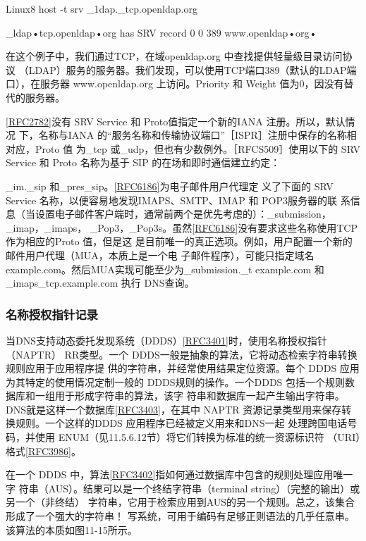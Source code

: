 Linux8 host -t srv \_1dap.\_tcp.openldap.org

\_ldap•tcp.openldap•org has SRV record 0 0 389 www.openldap•org•

在这个例子中，我们通过TCP，在域openldap.org 中查找提供轻量级目录访问协议
（LDAP）服务的服务器。我们发现，可以使用TCP端口389（默认的LDAP端口），在服务器
www.openldap.org 上访问。Priority 和 Weight 值为0，因没有替代的服务器。

\href{https://www.rfc-editor.org/rfc/rfc2782}{[RFC2782]}没有 SRV Service 和 Proto值指定一个新的IANA 注册。所以，默认情况
下，名称与IANA 的“服务名称和传输协议端口”［ISPR］注册中保存的名称相对应，Proto 值
为\_tcp 或\_udp，但也有少数例外。［RFCS509］使用以下的 SRV Service 和 Proto 名称为基于
SIP 的在场和即时通信建立约定：

\_im.\_sip 和\_pres\_sip。\href{https://www.rfc-editor.org/rfc/rfc6186}{[RFC6186]}为电子邮件用户代理定
义了下面的 SRV Service 名称，以便容易地发现IMAPS、SMTP、IMAP 和 POP3服务器的联
系信息（当设置电子邮件客户端时，通常前两个是优先考虑的）：\_submission，\_imap，\_imaps，
\_Pop3，\_Pop3s。虽然\href{https://www.rfc-editor.org/rfc/rfc6186}{[RFC6186]}没有要求这些名称使用TCP 作为相应的Proto 值，但是这
是目前唯一的真正选项。例如，用户配置一个新的邮件用户代理（MUA，本质上是一个电
子邮件程序），可能只指定域名 example.com。然后MUA实现可能至少为\_submission.\_t
example.com 和\_imaps\_tcp.example.com 执行 DNS查询。

\subsubsection{名称授权指针记录}

当DNS支持动态委托发现系统（DDDS）\href{https://www.rfc-editor.org/rfc/rfc3401}{[RFC3401]}时，使用名称授权指针（NAPTR）
RR类型。一个 DDDS一般是抽象的算法，它将动态检索字符串转换规则应用于应用程序提
供的字符串，并经常使用结果定位资源。每个 DDDS 应用为其特定的使用情况定制一般的
DDDS规则的操作。一个DDDS 包括一个规则数据库和一组用于形成字符串的算法，该字
符串和数据库一起产生输出字符串。DNS就是这样一个数据库\href{https://www.rfc-editor.org/rfc/rfc3403}{[RFC3403]}，在其中 NAPTR
资源记录类型用来保存转换规则。一个这样的DDDS 应用程序已经被定义用来和DNS一起
处理跨国电话号码，并使用 ENUM（见11.5.6.12节）将它们转换为标准的统一资源标识符
（URI）格式\href{https://www.rfc-editor.org/rfc/rfc3986}{[RFC3986]}。

在一个 DDDS 中，算法\href{https://www.rfc-editor.org/rfc/rfc3402}{[RFC3402]}指如何通过数据库中包含的规则处理应用唯一字
符串（AUS）。结果可以是一个终结字符串（terminal string）（完整的输出）或另一个（非终结）
字符串，它用于检索应用到AUS的另一个规则。总之，该集合形成了一个强大的字符串！
写系统，可用于编码有足够正则语法的几乎任意串。该算法的本质如图11-15所示。

